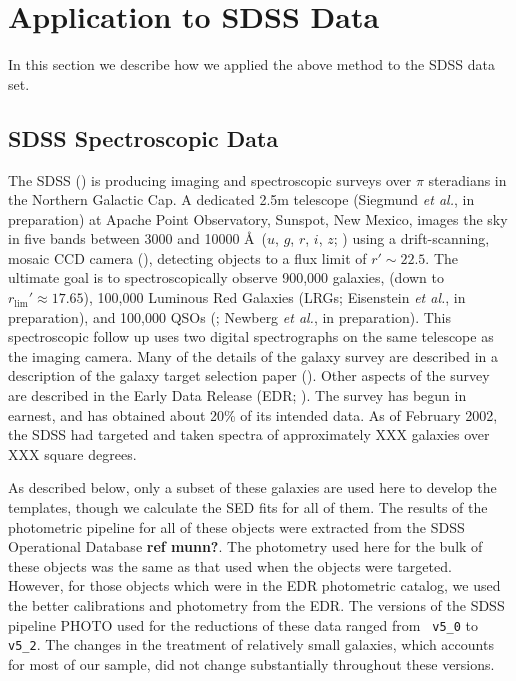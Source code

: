 \documentclass[10pt,preprint]{aastex}
\begin{document}
\section{Application to SDSS Data}
\label{data}

In this section we describe how we applied the above method to the
SDSS data set.

\subsection{SDSS Spectroscopic Data}

The SDSS (\citealt{york00a}) is producing imaging and spectroscopic
surveys over $\pi$ steradians in the Northern Galactic Cap. A
dedicated 2.5m telescope (Siegmund {\it et al.}, in preparation) at
Apache Point Observatory, Sunspot, New Mexico, images the sky in five
bands between 3000 and 10000 \AA\ ($u$, $g$, $r$, $i$, $z$;
\citealt{fukugita96a}) using a drift-scanning, mosaic CCD camera
(\citealt{gunn98a}), detecting objects to a flux limit of $r'\sim
22.5$. The ultimate goal is to spectroscopically observe 900,000
galaxies, (down to $r_{\mathrm{lim}}'\approx 17.65$), 100,000 Luminous
Red Galaxies (LRGs; Eisenstein {\it et al.}, in preparation), and
100,000 QSOs (\citealt{fan99a}; Newberg {\it et al.}, in preparation).
This spectroscopic follow up uses two digital spectrographs on the
same telescope as the imaging camera. Many of the details of the
galaxy survey are described in a description of the galaxy target
selection paper (\citealt{strauss02a}). Other aspects of the survey
are described in the Early Data Release (EDR;
\citealt{stoughton01a}). The survey has begun in earnest, and has
obtained about 20\% of its intended data.  As of February 2002, the
SDSS had targeted and taken spectra of approximately XXX galaxies over
XXX square degrees.

As described below, only a subset of these galaxies are used here to
develop the templates, though we calculate the SED fits for all of
them. The results of the photometric pipeline for all of these objects
were extracted from the SDSS Operational Database {\bf ref munn?}. The
photometry used here for the bulk of these objects was the same as
that used when the objects were targeted. However, for those objects
which were in the EDR photometric catalog, we used the better
calibrations and photometry from the EDR. The versions of the SDSS
pipeline PHOTO used for the reductions of these data ranged from {\tt
v5\_0} to {\tt v5\_2}. The changes in the treatment of relatively
small galaxies, which accounts for most of our sample, did not change
substantially throughout these versions.
\end{document}
